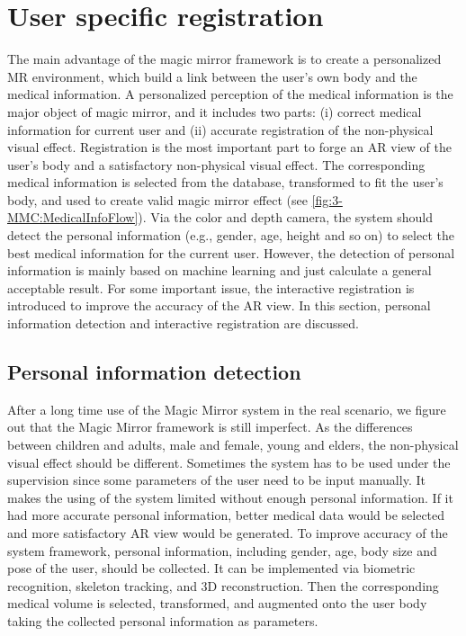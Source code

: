 \section{User specific registration} \label{sec:3-PPMM:Registration}
The main advantage of the magic mirror framework is to create a personalized MR environment, which build a link between the user's own body and the medical information. A personalized perception of the medical information is the major object of magic mirror, and it includes two parts: (i) correct medical information for current user and (ii) accurate registration of the non-physical visual effect. Registration is the most important part to forge an AR view of the user's body and a satisfactory non-physical visual effect.
The corresponding medical information is selected from the database, transformed to fit the user's body, and used to create valid magic mirror effect (see \figurename{\ref{fig:3-MMC:MedicalInfoFlow}}). Via the color and depth camera, the system should detect the personal information (e.g., gender, age, height and so on) to select the best medical information for the current user. 
However, the detection of personal information is mainly based on machine learning and just calculate a general acceptable result. For some important issue, the interactive registration is introduced to improve the accuracy of the AR view.
In this section, personal information detection and interactive registration are discussed.

\subsection{Personal information detection}
After a long time use of the Magic Mirror system in the real scenario, we figure out that the Magic Mirror framework is still imperfect. As the differences between children and adults, male and female, young and elders, the non-physical visual effect should be different. Sometimes the system has to be used under the supervision since some parameters of the user need to be input manually. 
It makes the using of the system limited without enough personal information.
If it had more accurate personal information, better medical data would be selected and more satisfactory AR view would be generated.
To improve accuracy of the system framework, personal information, including gender, age, body size and pose of the user, should be collected. It can be implemented via biometric recognition, skeleton tracking, and 3D reconstruction. Then the corresponding medical volume is selected, transformed, and augmented onto the user body taking the collected personal information as parameters. 

